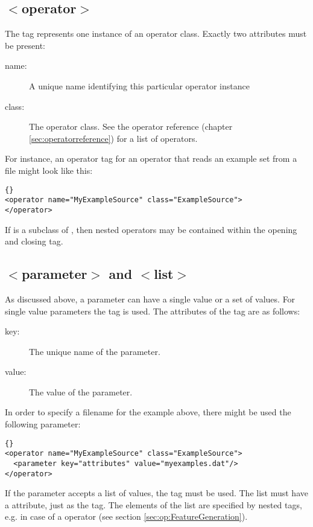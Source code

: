 {\subsection*{$<$operator$>$}
The  tag represents one instance of an operator
class. Exactly two attributes must be present:
\begin{description}
\item [name:] A unique name identifying this particular operator instance
\item [class:] The operator class. See the operator reference (chapter
\ref{sec:operatorreference}) for a list of operators.
\end{description}
For instance, an operator tag for an operator that reads an example
set from a file might look like this:\smallskip

\begin{lstlisting}[style=rapidminerxmlstyle]{}
<operator name="MyExampleSource" class="ExampleSource">
</operator>
\end{lstlisting}

\noindent
If  is a subclass of , then nested
operators may be contained within the opening and closing
tag.


\subsection*{$<$parameter$>$ and $<$list$>$}
As discussed above, a parameter can have a single value or a set of
values. For single value parameters the  tag is used. The
attributes of the  tag are as follows:
\begin{description}
\item[key:] The unique name of the parameter.
\item[value:] The value of the parameter. 
\end{description}

In order to specify a filename for the example above, there might be used the
following parameter:
\bigskip

\begin{lstlisting}[style=rapidminerxmlstyle]{}
<operator name="MyExampleSource" class="ExampleSource">
  <parameter key="attributes" value="myexamples.dat"/>
</operator>
\end{lstlisting}

If the parameter accepts a list of values, the  tag must be
used. The list must have a  attribute, just as the
 tag. The elements of the list are specified by nested
 tags, e.g. in case of a 
operator (see section \ref{sec:op:FeatureGeneration}).
\bigskip

}
